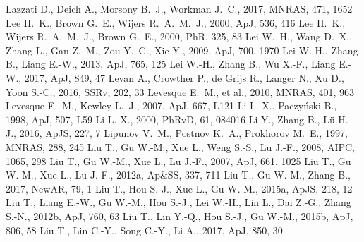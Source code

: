 \documentclass[a4paper,fleqn,usenatbib]{mnras}
\begin{document}
\begin{thebibliography}{207}
 Lazzati D., Deich A., Morsony B.~J., Workman J.~C., 2017, MNRAS, 471, 1652
 Lee H.~K., Brown G.~E., Wijers R.~A.~M.~J., 2000, ApJ, 536, 416
 Lee H.~K., Wijers R.~A.~M.~J., Brown G.~E., 2000, PhR, 325, 83
 Lei W.~H., Wang D.~X., Zhang L., Gan Z.~M., Zou Y.~C., Xie Y., 2009, ApJ, 700, 1970
 Lei W.-H., Zhang B., Liang E.-W., 2013, ApJ, 765, 125
 Lei W.-H., Zhang B., Wu X.-F., Liang E.-W., 2017, ApJ, 849, 47
 Levan A., Crowther P., de Grijs R., Langer N., Xu D., Yoon S.-C., 2016, SSRv, 202, 33
 Levesque E.~M., et al., 2010, MNRAS, 401, 963
 Levesque E.~M., Kewley L.~J., 2007, ApJ, 667, L121
 Li L.-X., Paczy{\'n}ski B., 1998, ApJ, 507, L59
 Li L.-X., 2000, PhRvD, 61, 084016
 Li Y., Zhang B., L{\"u} H.-J., 2016, ApJS, 227, 7
 Lipunov V.~M., Postnov K.~A., Prokhorov M.~E., 1997, MNRAS, 288, 245
 Liu T., Gu W.-M., Xue L., Weng S.-S., Lu J.-F., 2008, AIPC, 1065, 298
 Liu T., Gu W.-M., Xue L., Lu J.-F., 2007, ApJ, 661, 1025
 Liu T., Gu W.-M., Xue L., Lu J.-F., 2012a, Ap\&SS, 337, 711
 Liu T., Gu W.-M., Zhang B., 2017, NewAR, 79, 1
 Liu T., Hou S.-J., Xue L., Gu W.-M., 2015a, ApJS, 218, 12
 Liu T., Liang E.-W., Gu W.-M., Hou S.-J., Lei W.-H., Lin L., Dai Z.-G., Zhang S.-N., 2012b, ApJ, 760, 63
 Liu T., Lin Y.-Q., Hou S.-J., Gu W.-M., 2015b, ApJ, 806, 58
 Liu T., Lin C.-Y., Song C.-Y., Li A., 2017, ApJ, 850, 30

\end{thebibliography}
\end{document}
